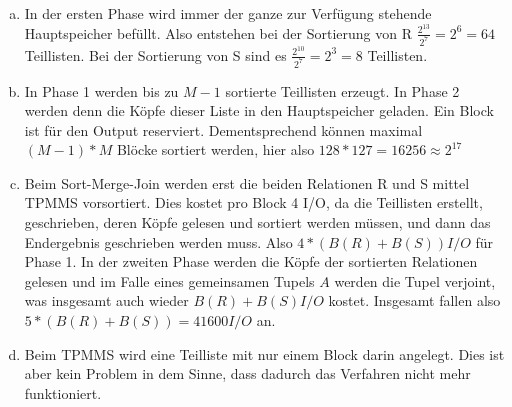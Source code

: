 \documentclass[12pt]{article}
\begin{document}
\begin{enumerate}[a)]
    \item In der ersten Phase wird immer der ganze zur Verfügung stehende
        Hauptspeicher befüllt. Also entstehen bei der Sortierung von R
        $\frac{2^{13}}{2^7} = 2^6 = 64$ Teillisten. Bei der Sortierung von S
        sind es $\frac{2^{10}}{2^7} = 2^3 = 8$ Teillisten.

    \item In Phase 1 werden bis zu $M - 1$ sortierte Teillisten erzeugt. In
        Phase 2 werden denn die Köpfe dieser Liste in den Hauptspeicher geladen.
        Ein Block ist für den Output reserviert. Dementsprechend können maximal
        $(M-1) * M$ Blöcke sortiert werden, hier also $128*127 = 16256 \approx
        2^{17}$

    \item Beim Sort-Merge-Join werden erst die beiden Relationen R und S mittel
        TPMMS vorsortiert. Dies kostet pro Block 4 I/O, da die Teillisten
        erstellt, geschrieben, deren Köpfe gelesen und sortiert werden müssen,
        und dann das Endergebnis geschrieben werden muss. Also $4*(B(R) + B(S))
        I/O$ für Phase 1. In der zweiten Phase werden die Köpfe der sortierten
        Relationen gelesen und im Falle eines gemeinsamen Tupels $A$ werden die
        Tupel verjoint, was insgesamt auch wieder $B(R)+B(S) I/O$ kostet.
        Insgesamt fallen also $5*(B(R)+B(S)) = 41600 I/O$ an.

    \item Beim TPMMS wird eine Teilliste mit nur einem Block darin angelegt.
        Dies ist aber kein Problem in dem Sinne, dass dadurch das Verfahren
        nicht mehr funktioniert.
\end{enumerate}
\end{document}
